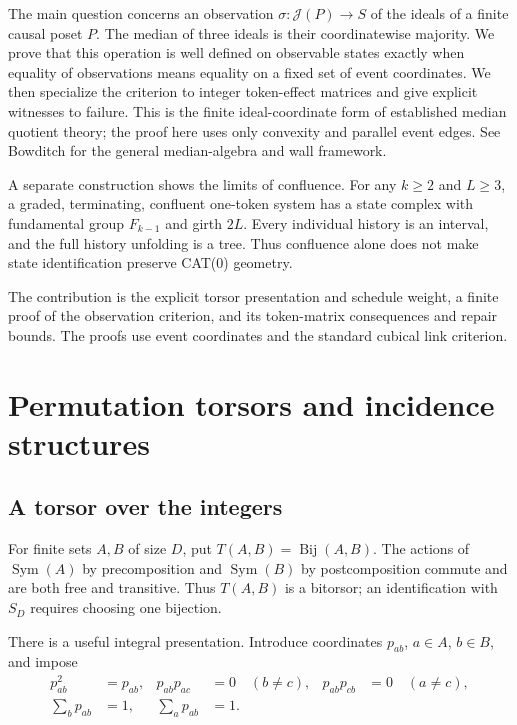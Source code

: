 \documentclass[11pt]{article}
\theoremstyle{definition}
\newcommand{\Bij}{\operatorname{Bij}}
\newcommand{\Sym}{\operatorname{Sym}}
\newcommand{\Id}{\mathcal J}
\numberwithin{equation}{section}
\begin{document}
The main question concerns an observation
$\sigma:\Id(P)\to S$ of the ideals of a finite causal poset $P$.
The median of three ideals is their coordinatewise majority.
We prove that this operation is well defined on observable states
exactly when equality of observations means equality on a fixed
set of event coordinates. We then specialize the criterion to
integer token-effect matrices and give explicit witnesses to failure.
This is the finite ideal-coordinate form of established median
quotient theory; the proof here uses only convexity and parallel
event edges. See Bowditch \cite[Sections 3, 7--9]{Bowditch} for the
general median-algebra and wall framework.

A separate construction shows the limits of confluence. For any
$k\ge2$ and $L\ge3$, a graded, terminating, confluent one-token
system has a state complex with fundamental group $F_{k-1}$ and
girth $2L$. Every individual history is an interval, and the full
history unfolding is a tree. Thus confluence alone does not make
state identification preserve CAT(0) geometry.

The contribution is the explicit torsor presentation and schedule
weight, a finite proof of the observation criterion, and its
token-matrix consequences and repair bounds. The proofs use event
coordinates and the standard cubical link criterion.

\section{Permutation torsors and incidence structures}

\subsection{A torsor over the integers}
For finite sets $A,B$ of size $D$, put
$T(A,B)=\Bij(A,B)$.
The actions of $\Sym(A)$ by precomposition and $\Sym(B)$ by
postcomposition commute and are both free and transitive.
Thus $T(A,B)$ is a bitorsor; an identification with $S_D$ requires
choosing one bijection.

There is a useful integral presentation. Introduce coordinates
$p_{ab}$, $a\in A$, $b\in B$, and impose
\begin{align}\label{eq:permutation}
 p_{ab}^2&=p_{ab},&
 p_{ab}p_{ac}&=0\quad(b\ne c),&
 p_{ab}p_{cb}&=0\quad(a\ne c),\\
 \sum_b p_{ab}&=1,& \sum_a p_{ab}&=1.\nonumber
\end{align}
\end{document}
